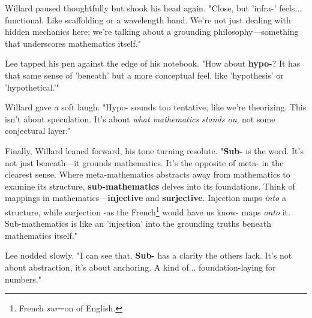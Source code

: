 Willard paused thoughtfully but shook his head again. "Close, but 'infra-' feels... functional. Like scaffolding or a wavelength band. We're not just dealing with hidden mechanics here; we're talking about a grounding philosophy—something that underscores mathematics itself."

Lee tapped his pen against the edge of his notebook. "How about \textbf{hypo-}? It has that same sense of 'beneath' but a more conceptual feel, like 'hypothesis' or 'hypothetical.'"

Willard gave a soft laugh. "Hypo- sounds too tentative, like we're theorizing. This isn't about speculation. It's about \textit{what mathematics stands on}, not some conjectural layer."

Finally, Willard leaned forward, his tone turning resolute. "\textbf{Sub-} is the word. It's not just beneath—it grounds mathematics. It’s the opposite of meta- in the clearest sense. Where meta-mathematics abstracts away from mathematics to examine its structure, \textbf{sub-mathematics} delves into its foundations. Think of mappings in mathematics—\textbf{injective} and \textbf{surjective}. Injection maps \textit{into} a structure, while surjection -as the French\footnote{French \textit{sur}=on of English.} would have us know- maps \textit{onto} it. Sub-mathematics is like an 'injection' into the grounding truths beneath mathematics itself."

Lee nodded slowly. "I can see that. \textbf{Sub-} has a clarity the others lack. It’s not about abstraction, it’s about anchoring. A kind of... foundation-laying for numbers."

